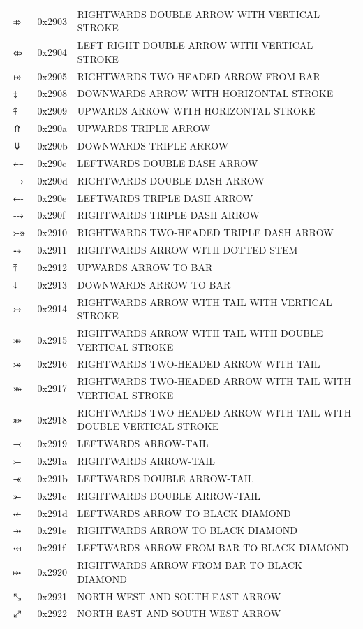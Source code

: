 \documentclass[12pt, twoside]{article}
\begin{document}
\begin{longtable}{L{1.0cm} L{2.0cm} >{\footnotesize}L{10cm}}
$⤃$&0x2903&RIGHTWARDS DOUBLE ARROW WITH VERTICAL STROKE\\
$⤄$&0x2904&LEFT RIGHT DOUBLE ARROW WITH VERTICAL STROKE\\
$⤅$&0x2905&RIGHTWARDS TWO-HEADED ARROW FROM BAR\\
$⤈$&0x2908&DOWNWARDS ARROW WITH HORIZONTAL STROKE\\
$⤉$&0x2909&UPWARDS ARROW WITH HORIZONTAL STROKE\\
$⤊$&0x290a&UPWARDS TRIPLE ARROW\\
$⤋$&0x290b&DOWNWARDS TRIPLE ARROW\\
$⤌$&0x290c&LEFTWARDS DOUBLE DASH ARROW\\
$⤍$&0x290d&RIGHTWARDS DOUBLE DASH ARROW\\
$⤎$&0x290e&LEFTWARDS TRIPLE DASH ARROW\\
$⤏$&0x290f&RIGHTWARDS TRIPLE DASH ARROW\\
$⤐$&0x2910&RIGHTWARDS TWO-HEADED TRIPLE DASH ARROW\\
$⤑$&0x2911&RIGHTWARDS ARROW WITH DOTTED STEM\\
$⤒$&0x2912&UPWARDS ARROW TO BAR\\
$⤓$&0x2913&DOWNWARDS ARROW TO BAR\\
$⤔$&0x2914&RIGHTWARDS ARROW WITH TAIL WITH VERTICAL STROKE\\
$⤕$&0x2915&RIGHTWARDS ARROW WITH TAIL WITH DOUBLE VERTICAL STROKE\\
$⤖$&0x2916&RIGHTWARDS TWO-HEADED ARROW WITH TAIL\\
$⤗$&0x2917&RIGHTWARDS TWO-HEADED ARROW WITH TAIL WITH VERTICAL STROKE\\
$⤘$&0x2918&RIGHTWARDS TWO-HEADED ARROW WITH TAIL WITH DOUBLE VERTICAL STROKE\\
$⤙$&0x2919&LEFTWARDS ARROW-TAIL\\
$⤚$&0x291a&RIGHTWARDS ARROW-TAIL\\
$⤛$&0x291b&LEFTWARDS DOUBLE ARROW-TAIL\\
$⤜$&0x291c&RIGHTWARDS DOUBLE ARROW-TAIL\\
$⤝$&0x291d&LEFTWARDS ARROW TO BLACK DIAMOND\\
$⤞$&0x291e&RIGHTWARDS ARROW TO BLACK DIAMOND\\
$⤟$&0x291f&LEFTWARDS ARROW FROM BAR TO BLACK DIAMOND\\
$⤠$&0x2920&RIGHTWARDS ARROW FROM BAR TO BLACK DIAMOND\\
$⤡$&0x2921&NORTH WEST AND SOUTH EAST ARROW\\
$⤢$&0x2922&NORTH EAST AND SOUTH WEST ARROW\\

\end{longtable}
\end{document}

